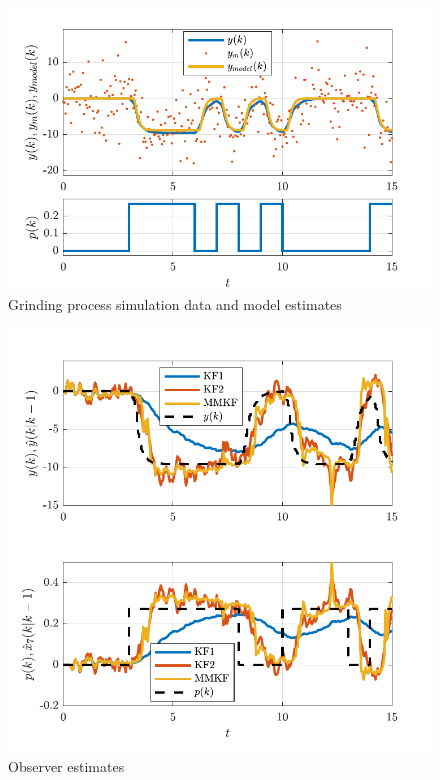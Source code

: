 \begin{figure}[htp]
	\centering
	\includegraphics[width=12cm]{images/rod_obs_sim_1_ioplot_P2DcTd4.pdf}
	\caption{Grinding process simulation data and model estimates}
	\label{fig:rod_obs_sim_1_ioplot_P2DcTd4}
\end{figure}

\begin{figure}[htp]
	\centering
	\includegraphics[width=12cm]{images/rod_obs_sim_1_est_P2DcTd4.pdf}
	\caption{Observer estimates}
	\label{fig:rod_obs_sim_1_est_P2DcTd4}
\end{figure}


